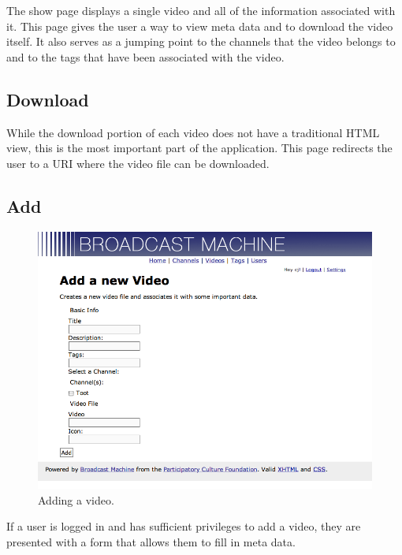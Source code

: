\documentclass[a4paper,12pt]{report}
\begin{document}
The show page displays a single video and all of the information associated with it.
This page gives the user a way to view meta data and to download the video itself.
It also serves as a jumping point to the channels that the video belongs to and to the tags that have been associated with the video.

\subsection{Download}
While the download portion of each video does not have a traditional HTML view, this is the most important part of the application.
This page redirects the user to a URI where the video file can be downloaded.

\subsection{Add}
\begin{figure}[h]
\begin{center}
\includegraphics[width=150mm]{./images/videoadd.png}
\end{center}
\caption{Adding a video.}
\end{figure}

If a user is logged in and has sufficient privileges to add a video, they are presented with a form that allows them to fill in meta data.
\end{document}
